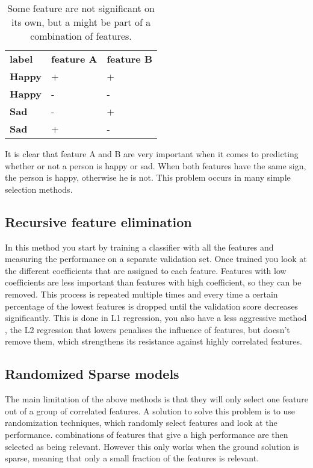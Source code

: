 \begin{table}[]
\centering
\label{featPair}
\begin{tabular}{lll}
\textbf{label} & \textbf{feature A} & \textbf{feature B} \\
\textbf{Happy} & +                  & +                  \\
\textbf{Happy} & -                  & -                  \\
\textbf{Sad}   & -                  & +                  \\
\textbf{Sad}   & +                  & -                 
\end{tabular}
\caption{Some feature are not significant on its own, but a might be part of a combination of features.}
\end{table}

It is clear that feature A and B are very important when it comes to predicting whether or not a person is happy or sad. When both features have the same sign, the person is happy, otherwise he is not. This problem occurs in many simple selection methods.

\subsection{Recursive feature elimination}
In this method you start by training a classifier with all the features and measuring the performance on a separate validation set. Once trained you look at the different coefficients that are assigned to each feature. Features with low coefficients are less important than features with high coefficient, so they can be removed. This process is repeated multiple times and every time a certain percentage of the lowest features is dropped until the validation score decreases significantly. This is done in L1 regression, you also have a less aggressive method , the L2 regression that lowers penalises the influence of features, but doesn't remove them, which strengthens its resistance against highly correlated features. 

\subsection{Randomized Sparse models}
The main limitation of the above methods is that they will only select one feature out of a group of correlated features. A solution to solve this problem is to use randomization techniques, which randomly select features and look at the performance. combinations of features that give a high performance are then selected as being relevant. However this only works when the ground solution is sparse, meaning that only a small fraction of the features is relevant.

